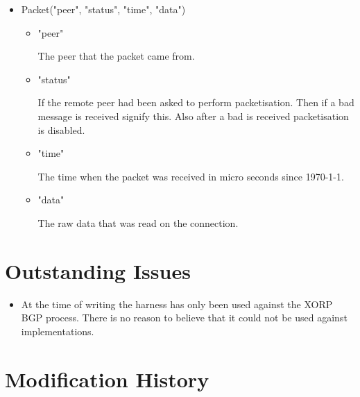 \documentclass[11pt]{article}
\begin{document}
\begin{itemize}
  \item Packet("peer", "status", "time", "data")

  \begin{itemize}
    \item "peer"
          
    The peer that the packet came from.

    \item "status" 

    If the remote peer had been asked to perform packetisation.
    Then if a bad message is received signify this. Also after a
    bad is received packetisation is disabled.

    \item "time"

    The time when the packet was received in micro seconds since
    \mbox{1970-1-1}.

    \item "data"
          
    The raw data that was read on the connection.

  \end{itemize}

\end{itemize}

\section{Outstanding Issues}

\begin{itemize}

  \item At the time of writing the harness has only been used against
  the XORP BGP process. There is no reason to believe that it could
  not be used against implementations.

\end{itemize}

\appendix
\section{Modification History}
\end{document}
